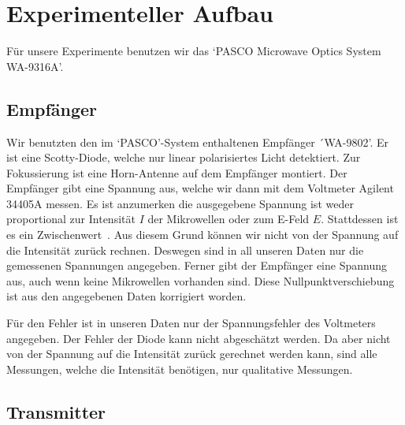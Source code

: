 \documentclass[a4paper,10pt,twocolumn]{article}
\begin{document}
    \section{Experimenteller Aufbau}
    Für unsere Experimente benutzen wir das `PASCO Microwave Optics System WA-9316A'.
    \subsection{Empfänger}
    
    Wir benutzten den im `PASCO'-System enthaltenen Empfänger ´WA-9802'.
    Er ist eine Scotty-Diode, welche nur linear polarisiertes Licht detektiert.
    Zur Fokussierung ist eine Horn-Antenne auf dem Empfänger montiert.
    Der Empfänger gibt eine Spannung aus, welche wir dann mit dem Voltmeter Agilent 34405A messen.
    Es ist anzumerken die ausgegebene Spannung ist weder proportional zur Intensität $I$ der Mikrowellen oder zum E-Feld $E$.
    Stattdessen ist es ein Zwischenwert~\cite{pasco}.
    Aus diesem Grund können wir nicht von der Spannung auf die Intensität zurück rechnen.
    Deswegen sind in all unseren Daten nur die gemessenen Spannungen angegeben.
    Ferner gibt der Empfänger eine Spannung aus, auch wenn keine Mikrowellen vorhanden sind.
    Diese Nullpunktverschiebung ist aus den angegebenen Daten korrigiert worden.
    
    Für den Fehler ist in unseren Daten nur der Spannungsfehler des Voltmeters angegeben.
    Der Fehler der Diode kann nicht abgeschätzt werden.
    Da aber nicht von der Spannung auf die Intensität zurück gerechnet werden kann, sind alle 
    Messungen, welche die Intensität benötigen, nur qualitative Messungen.
    
    \subsection{Transmitter}

    
\end{document}

